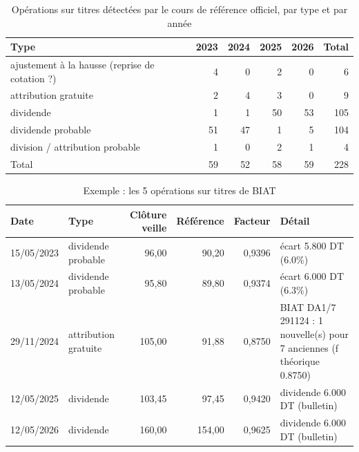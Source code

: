 \begin{table}[H]\centering\small\caption{Opérations sur titres détectées par le cours de référence officiel, par type et par année}\label{tab:annexe-ost}
\begin{tabular}{lrrrrr}\toprule
Type & 2023 & 2024 & 2025 & 2026 & Total \\ \midrule
ajustement à la hausse (reprise de cotation ?) & 4 & 0 & 2 & 0 & 6 \\
attribution gratuite & 2 & 4 & 3 & 0 & 9 \\
dividende & 1 & 1 & 50 & 53 & 105 \\
dividende probable & 51 & 47 & 1 & 5 & 104 \\
division / attribution probable & 1 & 0 & 2 & 1 & 4 \\
\midrule
Total & 59 & 52 & 58 & 59 & 228 \\
\bottomrule\end{tabular}\end{table}
\begin{table}[H]\centering\small\caption{Exemple : les 5 opérations sur titres de BIAT}\label{tab:annexe-biat}
\begin{tabular}{llrrrp{5cm}}\toprule
Date & Type & Clôture veille & Référence & Facteur & Détail \\ \midrule
15/05/2023 & dividende probable & 96{,}00 & 90{,}20 & 0{,}9396 & écart 5.800 DT (6.0\%) \\
13/05/2024 & dividende probable & 95{,}80 & 89{,}80 & 0{,}9374 & écart 6.000 DT (6.3\%) \\
29/11/2024 & attribution gratuite & 105{,}00 & 91{,}88 & 0{,}8750 & BIAT DA1/7 291124 : 1 nouvelle(s) pour 7 anciennes (f théorique 0.8750) \\
12/05/2025 & dividende & 103{,}45 & 97{,}45 & 0{,}9420 & dividende 6.000 DT (bulletin) \\
12/05/2026 & dividende & 160{,}00 & 154{,}00 & 0{,}9625 & dividende 6.000 DT (bulletin) \\
\bottomrule\end{tabular}\end{table}